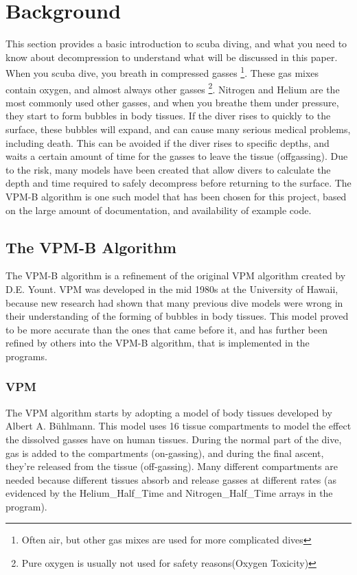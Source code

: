 \documentclass[12pt]{article}
\begin{document}
\section{Background}

This section provides a basic introduction to scuba diving, and what you need to know about decompression to
 understand what will be discussed in this paper. 
When you scuba dive, you breath in compressed gasses \footnote{Often air, but other gas mixes are used
for more complicated dives}. These gas mixes contain oxygen, and almost always other gasses \footnote{Pure oxygen
is usually not used for safety reasons(Oxygen Toxicity)}. Nitrogen and Helium are the most commonly used
other gasses, and when you breathe them under pressure, they start to form bubbles in body tissues. If the diver rises to quickly to the surface, these bubbles will expand, and can cause many serious medical problems, including death. This can
be avoided if the diver rises to specific depths, and waits a certain amount of time for the gasses to leave the
tissue (offgassing). Due to the risk, many models have been created that allow divers to calculate the depth and
time required to safely decompress before returning to the surface. The VPM-B algorithm is one such model that
has been chosen for this project, based on the large amount of documentation, and availability of example code.

\subsection{The VPM-B Algorithm}

 The VPM-B algorithm is a refinement of the original VPM algorithm created by D.E. Yount. VPM was developed
in the mid 1980s at the University of Hawaii, because new research had shown that many previous dive models
were wrong in their understanding of the forming of bubbles in body tissues\cite{yount86}. This model
proved to be more accurate than the ones that came before it, and has further been refined by others
into the VPM-B algorithm, that is implemented in the programs.

\subsubsection{VPM}
 The VPM algorithm starts by adopting a model of body tissues developed by Albert A. B\"uhlmann. This model
uses 16 tissue compartments to model the effect the dissolved gasses have on human tissues. During the
normal part of the dive, gas is added to the compartments\cite{Buhlmann84} (on-gassing), and during the final ascent,
they're released from the tissue (off-gassing). Many different compartments are needed because different
tissues absorb and release gasses at different rates (as evidenced by the Helium\_Half\_Time and
Nitrogen\_Half\_Time arrays in the program).
\end{document}
